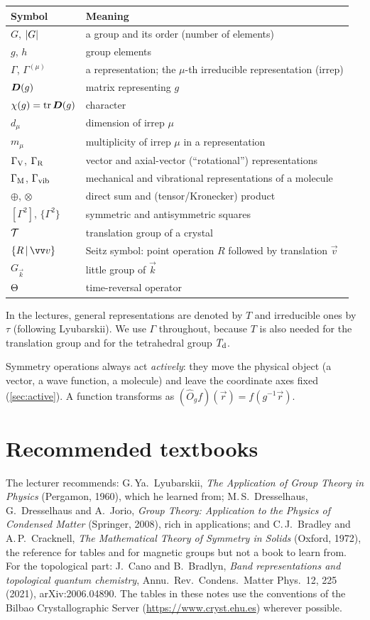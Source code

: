 \documentclass[11pt,openright]{book}
\begin{document}
\begin{center}
\begin{tabular}{@{}ll@{}}
\toprule
Symbol & Meaning\\
\midrule
$G$, $\lvert G\rvert$ & a group and its order (number of elements)\\
$g$, $h$ & group elements\\
$\Gamma$, $\Gamma^{(\mu)}$ & a representation; the $\mu$-th irreducible representation (irrep)\\
$\bm{D}(g)$ & matrix representing $g$\\
$\chi(g)=\operatorname{tr}\bm{D}(g)$ & character\\
$d_\mu$ & dimension of irrep $\mu$\\
$m_\mu$ & multiplicity of irrep $\mu$ in a representation\\
$\Gamma_{\mathrm{V}}$, $\Gamma_{\mathrm{R}}$ & vector and axial-vector (``rotational'') representations\\
$\Gamma_{\mathrm{M}}$, $\Gamma_{\mathrm{vib}}$ & mechanical and vibrational representations of a molecule\\
$\oplus$, $\otimes$ & direct sum and (tensor/Kronecker) product\\
$[\Gamma^2]$, $\{\Gamma^2\}$ & symmetric and antisymmetric squares\\
$\mathcal{T}$ & translation group of a crystal\\
$\seitz{R}{\vec{v}}$ & Seitz symbol: point operation $R$ followed by translation $\vec{v}$\\
$G_{\vec{k}}$ & little group of $\vec{k}$\\
$\Theta$ & time-reversal operator\\
\bottomrule
\end{tabular}
\end{center}
In the lectures, general representations are denoted by $T$ and irreducible ones by
$\tau$ (following Lyubarskii). We use $\Gamma$ throughout, because $T$ is also
needed for the translation group and for the tetrahedral group $T_{\mathrm{d}}$.

Symmetry operations always act \emph{actively}: they move the physical object
(a vector, a wave function, a molecule) and leave the coordinate axes fixed
(\cref{sec:active}). A function transforms as $(\hat{O}_g f)(\vec{r})=f(g^{-1}\vec{r})$.

\section*{Recommended textbooks}
The lecturer recommends:
G.\,Ya.\ Lyubarskii, \emph{The Application of Group Theory in Physics}
(Pergamon, 1960), which he learned from;
M.\,S.\ Dresselhaus, G.\ Dresselhaus and A.\ Jorio, \emph{Group Theory: Application
to the Physics of Condensed Matter} (Springer, 2008), rich in applications; and
C.\,J.\ Bradley and A.\,P.\ Cracknell, \emph{The Mathematical Theory of Symmetry in
Solids} (Oxford, 1972), the reference for tables and for magnetic groups but not a
book to learn from. For the topological part: J.\ Cano and B.\ Bradlyn,
\emph{Band representations and topological quantum chemistry},
Annu.\ Rev.\ Condens.\ Matter Phys.\ 12, 225 (2021), arXiv:2006.04890.
The tables in these notes use the conventions of the Bilbao Crystallographic Server
(\url{https://www.cryst.ehu.es}) wherever possible.

\mainmatter








\end{document}
